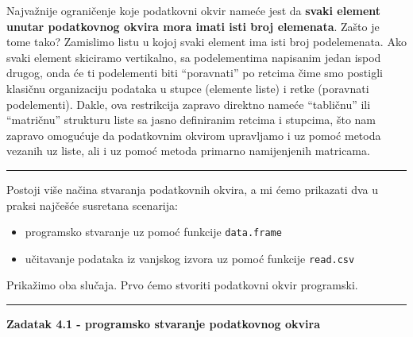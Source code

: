 \documentclass[]{book}
\providecommand{\tightlist}{%
  \setlength{\itemsep}{0pt}\setlength{\parskip}{0pt}}
\theoremstyle{definition}
\theoremstyle{definition}
\theoremstyle{definition}
\theoremstyle{remark}
\begin{document}
Najvažnije ograničenje koje podatkovni okvir nameće jest da
\textbf{svaki element unutar podatkovnog okvira mora imati isti broj
elemenata}. Zašto je tome tako? Zamislimo listu u kojoj svaki element
ima isti broj podelemenata. Ako svaki element skiciramo vertikalno, sa
podelementima napisanim jedan ispod drugog, onda će ti podelementi biti
``poravnati'' po retcima čime smo postigli klasičnu organizaciju
podataka u stupce (elemente liste) i retke (poravnati podelementi).
Dakle, ova restrikcija zapravo direktno nameće ``tabličnu'' ili
``matričnu'' strukturu liste sa jasno definiranim retcima i stupcima,
što nam zapravo omogućuje da podatkovnim okvirom upravljamo i uz pomoć
metoda vezanih uz liste, ali i uz pomoć metoda primarno namijenjenih
matricama.

\begin{center}\rule{0.5\linewidth}{\linethickness}\end{center}

Postoji više načina stvaranja podatkovnih okvira, a mi ćemo prikazati
dva u praksi najčešće susretana scenarija:

\begin{itemize}
\tightlist
\item
  programsko stvaranje uz pomoć funkcije \texttt{data.frame}
\item
  učitavanje podataka iz vanjskog izvora uz pomoć funkcije
  \texttt{read.csv}
\end{itemize}

Prikažimo oba slučaja. Prvo ćemo stvoriti podatkovni okvir programski.

\begin{center}\rule{0.5\linewidth}{\linethickness}\end{center}

\textbf{Zadatak 4.1 - programsko stvaranje podatkovnog okvira}
\end{document}
